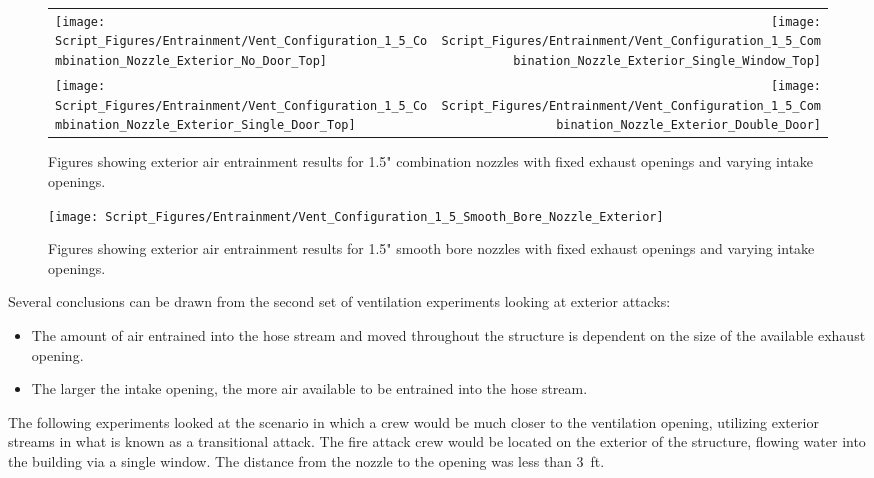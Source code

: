\documentclass[12pt,oneside]{book}
\begin{document}
\begin{figure}[!ht]
\begin{tabular*}{\textwidth}{lr}
\texttt{[image: Script\_Figures/Entrainment/Vent\_Configuration\_1\_5\_Combination\_Nozzle\_Exterior\_No\_Door\_Top]} &
\texttt{[image: Script\_Figures/Entrainment/Vent\_Configuration\_1\_5\_Combination\_Nozzle\_Exterior\_Single\_Window\_Top]} \\
\texttt{[image: Script\_Figures/Entrainment/Vent\_Configuration\_1\_5\_Combination\_Nozzle\_Exterior\_Single\_Door\_Top]} &
\texttt{[image: Script\_Figures/Entrainment/Vent\_Configuration\_1\_5\_Combination\_Nozzle\_Exterior\_Double\_Door]} \\
\end{tabular*}
\caption{Figures showing exterior air entrainment results for 1.5" combination nozzles with fixed exhaust openings and varying intake openings.}
\label{fig:1_5_Exterior_Combination_Vents}
\end{figure}

\clearpage

\begin{figure}[!ht]
\centering
\texttt{[image: Script\_Figures/Entrainment/Vent\_Configuration\_1\_5\_Smooth\_Bore\_Nozzle\_Exterior]}
\caption{Figures showing exterior air entrainment results for 1.5" smooth bore nozzles with fixed exhaust openings and varying intake openings.}
\label{fig:1_5_Exterior_Smooth_Bore_Vents}
\end{figure}

Several conclusions can be drawn from the second set of ventilation experiments looking at exterior attacks:

\begin{itemize}
	\item The amount of air entrained into the hose stream and moved throughout the structure is dependent on the size of the available exhaust opening.
	\item The larger the intake opening, the more air available to be entrained into the hose stream.
\end{itemize}

\clearpage

The following experiments looked at the scenario in which a crew would be much closer to the ventilation opening, utilizing exterior streams in what is known as a transitional attack. The fire attack crew would be located on the exterior of the structure, flowing water into the building via a single window. The distance from the nozzle to the opening was less than 3~ft.
\end{document}
